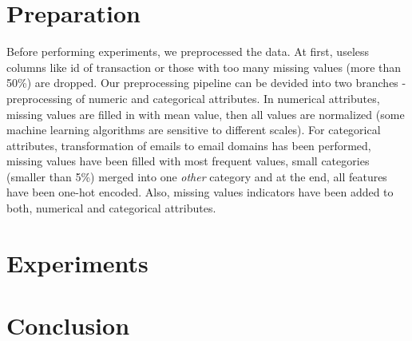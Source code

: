 \documentclass[runningheads]{llncs}
\begin{document}






\section{Preparation}

Before performing experiments, we preprocessed the data. At first, useless columns like id of transaction or those with too many missing values (more than 50\%) are dropped. Our preprocessing pipeline can be devided into two branches - preprocessing of numeric and categorical attributes. In numerical attributes, missing values are filled in with mean value, then all values are normalized (some machine learning algorithms are sensitive to different scales). For categorical attributes, transformation of emails to email domains has been performed, missing values have been filled with most frequent values, small categories (smaller than 5\%) merged into one \textit{other} category and at the end, all features have been one-hot encoded. Also, missing values indicators have been added to both, numerical and categorical attributes.



\section{Experiments}


\section{Conclusion}




\end{document}
